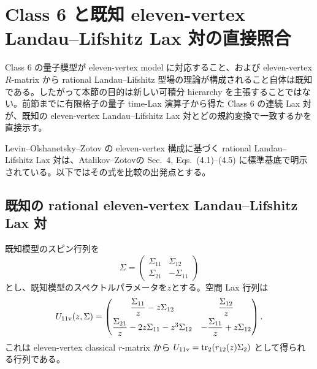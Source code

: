 \section{Class 6 と既知 eleven-vertex Landau--Lifshitz Lax 対の直接照合}
\label{sec:class6-eleven-vertex-comparison}

Class 6 の量子模型が eleven-vertex model に対応すること、および eleven-vertex $R$-matrix から rational Landau--Lifshitz 型場の理論が構成されること自体は既知である\cite{CdL2024,LOZ2014}。したがって本節の目的は新しい可積分 hierarchy を主張することではない。前節までに有限格子の量子 time-Lax 演算子から得た Class 6 の連続 Lax 対が、既知の eleven-vertex Landau--Lifshitz Lax 対とどの規約変換で一致するかを直接示す。

Levin--Olshanetsky--Zotov の eleven-vertex 構成\cite{LOZ2014}に基づく rational Landau--Lifshitz Lax 対は、Atalikov--Zotov\cite{AtalikovZotov2021}の Sec.~4, Eqs.~(4.1)--(4.5) に標準基底で明示されている。以下ではその式を比較の出発点とする。

\subsection{既知の rational eleven-vertex Landau--Lifshitz Lax 対}

既知模型のスピン行列を
\begin{equation}
\Sigma=
\begin{pmatrix}
\Sigma_{11}&\Sigma_{12}\\
\Sigma_{21}&-\Sigma_{11}
\end{pmatrix}
\label{eq:eleven-sigma-generic}
\end{equation}
とし、既知模型のスペクトルパラメータを$z$とする。空間 Lax 行列は
\begin{equation}
U_{\rm 11v}(z,\Sigma)=
\begin{pmatrix}
\dfrac{\Sigma_{11}}{z}-z\Sigma_{12}
&\dfrac{\Sigma_{12}}{z}\\[2mm]
\dfrac{\Sigma_{21}}{z}-2z\Sigma_{11}-z^3\Sigma_{12}
&-\dfrac{\Sigma_{11}}{z}+z\Sigma_{12}
\end{pmatrix}.
\label{eq:eleven-U}
\end{equation}
これは eleven-vertex classical $r$-matrix から
$U_{\rm 11v}=\operatorname{tr}_2(r_{12}(z)\Sigma_2)$
として得られる行列である\cite{LOZ2014,AtalikovZotov2021}。

